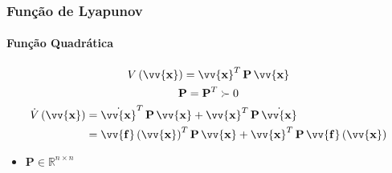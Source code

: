 \documentclass{beamer}
\newcommand*{\Round}[1]{\left(#1\right)}
\newcommand*{\Prod}{\,}
\newcommand*{\Bold}[1]{\boldsymbol{\mathbf{#1}}}
\newcommand*{\Matr}[1]{\Bold{#1}}
\newcommand*{\Vect}[1]{\vv{\Bold{#1}}}
\newcommand*{\Transp}[1]{{#1}^{T}}
\renewcommand{\Prod}{\,}
\begin{document}
\begin{frame}\frametitle{Função de Lyapunov}\framesubtitle{Função Quadrática}
  \begin{gather}
    V\Round{\Vect{x}}= \Transp{\Vect{x}} \Prod \Matr{P} \Prod \Vect{x}
    \\
    \Matr{P} = \Transp{\Matr{P}} \succ 0
    \\
    \begin{aligned}
      \dot{V}\Round{\Vect{x}}
      &= \Transp{\dot{\Vect{x}}} \Prod \Matr{P} \Prod \Vect{x} + \Transp{\Vect{x}} \Prod \Matr{P} \Prod \dot{\Vect{x}}
      \\
      &= \Transp{\Vect{f}\Round{\Vect{x}}} \Prod \Matr{P} \Prod \Vect{x} + \Transp{\Vect{x}} \Prod \Matr{P} \Prod \Vect{f}\Round{\Vect{x}}
    \end{aligned}
  \end{gather}
  \begin{itemize}
    \item $\Matr{P} \in \mathbb{R}^{n \times n}$
  \end{itemize}
\end{frame}
\end{document}
